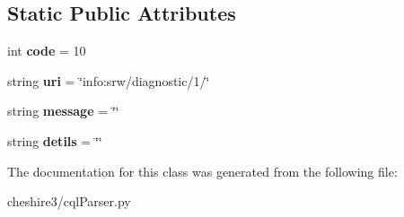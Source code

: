 \subsection*{Static Public Attributes}
\begin{DoxyCompactItemize}
\item 
\hypertarget{classcheshire3_1_1cql_parser_1_1_diagnostic_a03c0bbedfe0a73263f3567efdbd99673}{int {\bfseries code} = 10}\label{classcheshire3_1_1cql_parser_1_1_diagnostic_a03c0bbedfe0a73263f3567efdbd99673}

\item 
\hypertarget{classcheshire3_1_1cql_parser_1_1_diagnostic_aa5828a8ed1365f746761a1e68cdb1c49}{string {\bfseries uri} = \char`\"{}info\-:srw/diagnostic/1/\char`\"{}}\label{classcheshire3_1_1cql_parser_1_1_diagnostic_aa5828a8ed1365f746761a1e68cdb1c49}

\item 
\hypertarget{classcheshire3_1_1cql_parser_1_1_diagnostic_ab91c84483891fee77bc8d4124a3dfe5d}{string {\bfseries message} = \char`\"{}\char`\"{}}\label{classcheshire3_1_1cql_parser_1_1_diagnostic_ab91c84483891fee77bc8d4124a3dfe5d}

\item 
\hypertarget{classcheshire3_1_1cql_parser_1_1_diagnostic_a3f95065ebe67f3604b10cbc4a837a572}{string {\bfseries detils} = \char`\"{}\char`\"{}}\label{classcheshire3_1_1cql_parser_1_1_diagnostic_a3f95065ebe67f3604b10cbc4a837a572}

\end{DoxyCompactItemize}


The documentation for this class was generated from the following file\-:\begin{DoxyCompactItemize}
\item 
cheshire3/cql\-Parser.\-py\end{DoxyCompactItemize}

